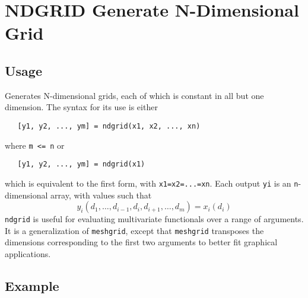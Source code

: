 \section{NDGRID Generate N-Dimensional Grid}

\subsection{Usage}

Generates N-dimensional grids, each of which is constant in all but
one dimension.  The syntax for its use is either
\begin{verbatim}
   [y1, y2, ..., ym] = ndgrid(x1, x2, ..., xn)
\end{verbatim}
where \verb|m <= n| or 
\begin{verbatim}
   [y1, y2, ..., ym] = ndgrid(x1)
\end{verbatim}
which is equivalent to the first form, with \verb|x1=x2=...=xn|.  Each
output \verb|yi| is an \verb|n|-dimensional array, with values such that
\[
y_i(d_1,\ldots,d_{i-1},d_{i},d_{i+1},\ldots,d_m) = x_i(d_{i})
\]
\verb|ndgrid| is useful for evaluating multivariate functionals over a
range of arguments.  It is a generalization of \verb|meshgrid|, except
that \verb|meshgrid| transposes the dimensions corresponding to the 
first two arguments to better fit graphical applications.
\subsection{Example}

